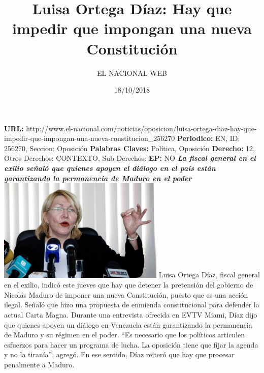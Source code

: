 \documentclass{article}%
\title{\textbf{Luisa Ortega Díaz: Hay que impedir que impongan una nueva Constitución}}%
\author{EL NACIONAL WEB}%
\date{18/10/2018}%
\begin{document}
%
\normalsize%
\maketitle%
\textbf{URL: }%
http://www.el{-}nacional.com/noticias/oposicion/luisa{-}ortega{-}diaz{-}hay{-}que{-}impedir{-}que{-}impongan{-}una{-}nueva{-}constitucion\_256270\newline%
%
\textbf{Periodico: }%
EN, %
ID: %
256270, %
Seccion: %
Oposición\newline%
%
\textbf{Palabras Claves: }%
Política, Oposición\newline%
%
\textbf{Derecho: }%
12, %
Otros Derechos: %
CONTEXTO, %
Sub Derechos: %
\newline%
%
\textbf{EP: }%
NO\newline%
\newline%
%
\textbf{\textit{La fiscal general en el exilio señaló que quienes apoyen el diálogo en el país están garantizando la permanencia de Maduro en el poder~}}%
\newline%
\newline%
%
\includegraphics[width=300px]{211.jpg}%
\newline%
%
Luisa Ortega Díaz, fiscal general en el exilio, indicó este jueves que hay que detener la pretensión del gobierno de Nicolás Maduro de imponer una nueva Constitución, puesto que es una acción ilegal.%
\newline%
%
Señaló que hizo una propuesta de enmienda constitucional para defender la actual Carta Magna.%
\newline%
%
Durante una entrevista ofrecida en EVTV Miami, Díaz dijo que quienes apoyen un diálogo en Venezuela están garantizando la permanencia de Maduro y su régimen en el poder.%
\newline%
%
“Es necesario que los políticos articulen esfuerzos para hacer un programa de lucha. La oposición tiene que fijar la agenda y no la tiranía”, agregó.%
\newline%
%
En ese sentido, Díaz reiteró que hay que procesar penalmente a Maduro.%
\newline%
%
\end{document}
